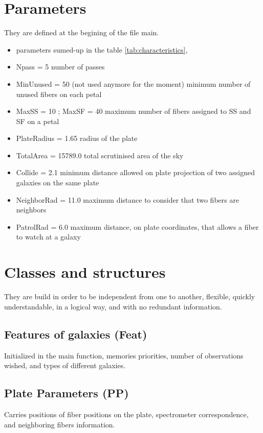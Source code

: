 \documentclass{article}
\begin{document}
       \section{Parameters}
       They are defined at the begining of the file main.
       \begin{itemize} 
	       \item parameters sumed-up in the table \ref{tab:characteristics},
	       \item Npass = 5 number of passes
	       \item MinUnused = 50 (not used anymore for the moment) minimum number of unused fibers on each petal
	       \item MaxSS = 10 ; MaxSF = 40 maximum number of fibers assigned to SS and SF on a petal
	       \item PlateRadius = 1.65 radius of the plate
	       \item TotalArea = 15789.0 total scrutinised area of the sky
	       \item Collide = 2.1 minimum distance allowed on plate projection of two assigned galaxies on the same plate
	       \item NeighborRad = 11.0 maximum distance to consider that two fibers are neighbors
	       \item PatrolRad = 6.0 maximum distance, on plate coordinates, that allows a fiber to watch at a galaxy
       \end{itemize} 


 \section{Classes and structures}
They are build in order to be independent from one to another, flexible, quickly understandable, in a logical way, and with no redundant information.

 \subsection{Features of galaxies (Feat)}
Initialized in the main function, memories priorities, number of observations wished, and types of different galaxies.
 
\subsection{Plate Parameters (PP)}
Carries positions of fiber positions on the plate, spectrometer correspondence, and neighboring fibers information.
\end{document}
